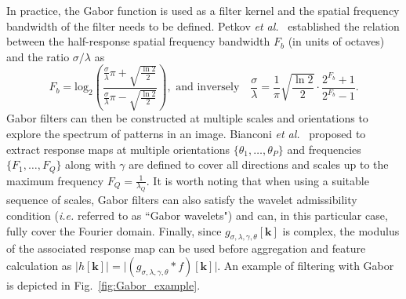 \documentclass[fleqn,a4paper,oneside,openany]{book}
\begin{document}
In practice, the Gabor function is used as a filter kernel and the spatial frequency bandwidth of the filter needs to be defined. 
Petkov \textit{et al.}~\cite{Petkov1997} established the relation between the half-response spatial frequency bandwidth $F_b$ (in units of octaves) and the ratio $\sigma / \lambda$ as
%
\begin{equation}\label{eq:GaborSFB}
F_b = \mathrm{log}_2 \left( \frac{\frac{\sigma}{\lambda}\pi+\sqrt{\frac{\ln 2}{2}}}{\frac{\sigma}{\lambda}\pi-\sqrt{\frac{\ln 2}{2}}} \right), \text{ and inversely}\quad \frac{\sigma}{\lambda} = \frac{1}{\pi} \sqrt{\frac{\ln 2}{2}} \cdot \frac{2^{F_b}+1}{2^{F_b}-1}.
\end{equation}
%
Gabor filters can then be constructed at multiple scales and orientations to explore the spectrum of patterns in an image. 
Bianconi \textit{et al.}~\cite{Bianconi2007} proposed to extract response maps at multiple orientations $\{\theta_1,\dots,\theta_P\}$ and frequencies $\{F_1,\dots,F_Q\}$ along with $\gamma$ are defined to cover all directions and scales up to the maximum frequency $F_Q=\frac{1}{\lambda_Q}$.
It is worth noting that when using a suitable sequence of scales, Gabor filters can also satisfy the wavelet admissibility condition (\textit{i.e.} referred to as ``Gabor wavelets") and can, in this particular case, fully cover the Fourier domain.
Finally, since $g_{\sigma,\lambda,\gamma,\theta}[\boldsymbol{k}]$ is complex, the modulus of the associated response map can be used before aggregation and feature calculation as $\lvert h[\boldsymbol{k}] \rvert = \lvert (g_{\sigma,\lambda,\gamma,\theta} \ast f) [\boldsymbol{k}]\rvert$.
An example of filtering with Gabor is depicted in Fig.~\ref{fig:Gabor_example}.
%
\end{document}

